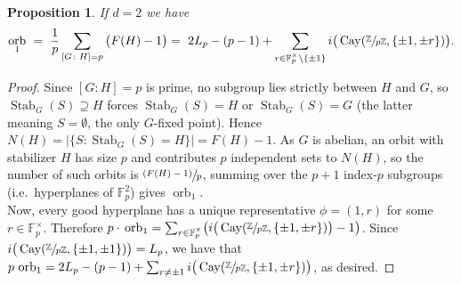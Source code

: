 \documentclass{article}
\theoremstyle{plain}
\newtheorem{lemma}[theorem]{Lemma}
\newtheorem{proposition}[theorem]{Proposition}
\theoremstyle{definition}
\theoremstyle{remark}
\newcommand{\Z}{\mathbb{Z}}
\newcommand{\F}{\mathbb{F}}
\newcommand{\quot}[2]{\sfrac{#1}{#2}}
\DeclareMathOperator{\Cay}{Cay}
\DeclareMathOperator{\Stab}{Stab}
\DeclareMathOperator{\Ind}{Ind}
\DeclareMathOperator{\orb}{orb}
\begin{document}

\begin{proposition}\label{lem:mobius}
If $d=2$ we have $$\orb_1\ =\ \frac1p\sum_{[G \colon H]=p}\big(F(H)-1\big)=\ 2L_p-(p-1)+\sum_{r\in\F_p^\times\setminus\{\pm1\}} i\big(\Cay(\sfrac{\Z}{p\Z},\{\pm1,\pm r\})\big).$$ 

\end{proposition}
\begin{proof}
Since $[G:H]=p$ is prime, no subgroup lies strictly between $H$ and $G$, so $\Stab_G(S)\supseteq H$ forces $\Stab_G(S)=H$ or $\Stab_G(S)=G$ (the latter meaning $S=\emptyset$, the only $G$-fixed point). Hence $N(H)=|\{S:\Stab_G(S)=H\}|=F(H)-1$. As $G$ is abelian, an orbit with stabilizer $H$ has size $p$ and contributes $p$ independent sets to $N(H)$, so the number of such orbits is $\sfrac{(F(H)-1)}{p}$, summing over the $p+1$ index-$p$ subgroups (i.e.\ hyperplanes of $\F_p^2$) gives $\orb_1$.\\

Now, every good hyperplane has a unique representative $\phi=(1,r)$ for some $ r\in\F_p^\times$. Therefore $p \cdot \,\operatorname{orb}_1
=
\sum_{r\in\F_p^\times}\bigl(i\big(\Cay(\sfrac{\Z}{p\Z},\{\pm1,\pm r\})\big)-1\bigr)$. Since $i\big(\Cay(\sfrac{\Z}{p\Z},\{\pm1,\pm 1\})\big)=L_p$, we have that $p\,\operatorname{orb}_1 = 2L_p-(p-1) + \sum_{r\ne\pm1}i\big(\Cay(\sfrac{\Z}{p\Z},\{\pm1,\pm r\})\big)$, as desired. 
\end{proof}



\end{document}
